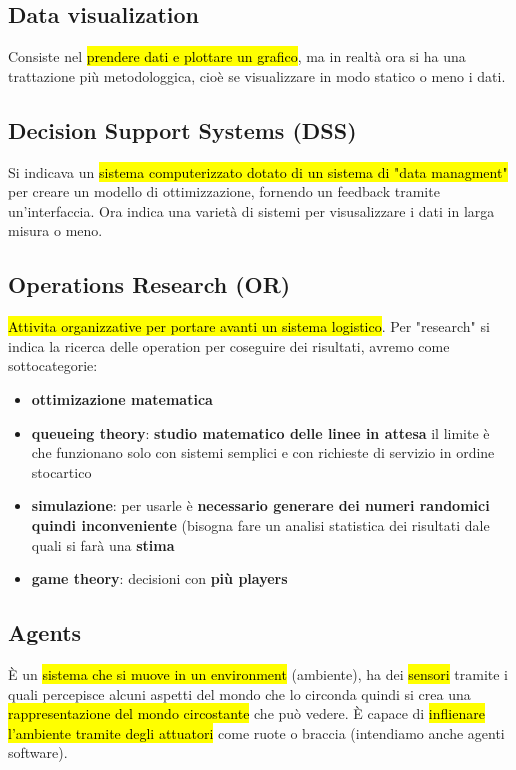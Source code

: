 \subsection{Data visualization}

Consiste nel \hl{prendere dati e plottare un grafico}, ma in realtà ora si ha una trattazione più metodologgica, cioè se visualizzare in  modo statico o meno i dati.


\subsection{Decision Support Systems (DSS)}

Si indicava un \hl{sistema computerizzato dotato di un sistema di "data managment"} per creare un modello di ottimizzazione, fornendo un feedback tramite un'interfaccia. Ora indica una varietà di sistemi per visusalizzare i dati in larga misura o meno.


\subsection{Operations Research (OR)}

\hl{Attivita organizzative per portare avanti un sistema logistico}. Per "research" si indica la ricerca delle operation per coseguire dei risultati, avremo come sottocategorie:
\begin{itemize}
	\item \textbf{ottimizazione matematica}
	\item \textbf{queueing theory}: \textbf{studio matematico delle linee in attesa}  il limite è che funzionano solo con sistemi semplici e con richieste di servizio in ordine stocartico
	\item \textbf{simulazione}: per usarle è \textbf{necessario generare dei numeri randomici}  \textbf{quindi  inconveniente} (bisogna fare un analisi statistica dei risultati dale quali si farà una \textbf{stima} 
	\item \textbf{game theory}: decisioni con \textbf{più players}
\end{itemize}


\subsection{Agents}

È un \hl{sistema che si muove in un environment} (ambiente), ha dei \hl{sensori} tramite i quali percepisce alcuni aspetti del mondo che lo circonda quindi si crea una \hl{rappresentazione del mondo circostante} che può vedere. È capace di \hl{inflienare l'ambiente tramite degli attuatori} come ruote o braccia (intendiamo anche agenti software).

